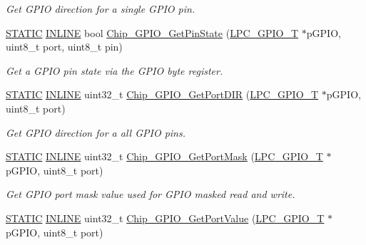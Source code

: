 \begin{DoxyCompactItemize}
\begin{DoxyCompactList}\small\item\em Get G\+P\+IO direction for a single G\+P\+IO pin. \end{DoxyCompactList}\item 
\hyperlink{group__LPC__Types__Public__Macros_ga10b2d890d871e1489bb02b7e70d9bdfb}{S\+T\+A\+T\+IC} \hyperlink{group__LPC__Types__Public__Types_ga2eb6f9e0395b47b8d5e3eeae4fe0c116}{I\+N\+L\+I\+NE} bool \hyperlink{group__GPIO__17XX__40XX_ga9f0e35190f01c706564a88f1f88cf716}{Chip\+\_\+\+G\+P\+I\+O\+\_\+\+Get\+Pin\+State} (\hyperlink{structLPC__GPIO__T}{L\+P\+C\+\_\+\+G\+P\+I\+O\+\_\+T} $\ast$p\+G\+P\+IO, uint8\+\_\+t port, uint8\+\_\+t pin)
\begin{DoxyCompactList}\small\item\em Get a G\+P\+IO pin state via the G\+P\+IO byte register. \end{DoxyCompactList}\item 
\hyperlink{group__LPC__Types__Public__Macros_ga10b2d890d871e1489bb02b7e70d9bdfb}{S\+T\+A\+T\+IC} \hyperlink{group__LPC__Types__Public__Types_ga2eb6f9e0395b47b8d5e3eeae4fe0c116}{I\+N\+L\+I\+NE} uint32\+\_\+t \hyperlink{group__GPIO__17XX__40XX_ga06f22d0dfeb6a06b8280df9bead0fc4b}{Chip\+\_\+\+G\+P\+I\+O\+\_\+\+Get\+Port\+D\+IR} (\hyperlink{structLPC__GPIO__T}{L\+P\+C\+\_\+\+G\+P\+I\+O\+\_\+T} $\ast$p\+G\+P\+IO, uint8\+\_\+t port)
\begin{DoxyCompactList}\small\item\em Get G\+P\+IO direction for a all G\+P\+IO pins. \end{DoxyCompactList}\item 
\hyperlink{group__LPC__Types__Public__Macros_ga10b2d890d871e1489bb02b7e70d9bdfb}{S\+T\+A\+T\+IC} \hyperlink{group__LPC__Types__Public__Types_ga2eb6f9e0395b47b8d5e3eeae4fe0c116}{I\+N\+L\+I\+NE} uint32\+\_\+t \hyperlink{group__GPIO__17XX__40XX_ga6b8d692c29a4d64326130bd237826a4b}{Chip\+\_\+\+G\+P\+I\+O\+\_\+\+Get\+Port\+Mask} (\hyperlink{structLPC__GPIO__T}{L\+P\+C\+\_\+\+G\+P\+I\+O\+\_\+T} $\ast$p\+G\+P\+IO, uint8\+\_\+t port)
\begin{DoxyCompactList}\small\item\em Get G\+P\+IO port mask value used for G\+P\+IO masked read and write. \end{DoxyCompactList}\item 
\hyperlink{group__LPC__Types__Public__Macros_ga10b2d890d871e1489bb02b7e70d9bdfb}{S\+T\+A\+T\+IC} \hyperlink{group__LPC__Types__Public__Types_ga2eb6f9e0395b47b8d5e3eeae4fe0c116}{I\+N\+L\+I\+NE} uint32\+\_\+t \hyperlink{group__GPIO__17XX__40XX_ga14c7161208fed3f7ac4e62953353ab9b}{Chip\+\_\+\+G\+P\+I\+O\+\_\+\+Get\+Port\+Value} (\hyperlink{structLPC__GPIO__T}{L\+P\+C\+\_\+\+G\+P\+I\+O\+\_\+T} $\ast$p\+G\+P\+IO, uint8\+\_\+t port)

\end{DoxyCompactItemize}

